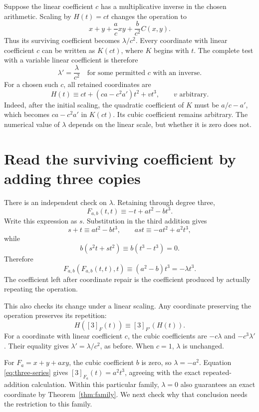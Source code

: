 Suppose the linear coefficient \(c\) has a multiplicative inverse in the chosen arithmetic. Scaling by \(H(t)=ct\) changes the operation to
\[
 x+y+\frac acxy+\frac b{c^2}C(x,y).
\]
Thus its surviving coefficient becomes \(\lambda/c^2\). Every coordinate with linear coefficient \(c\) can be written as \(K(ct)\), where \(K\) begins with \(t\). The complete test with a variable linear coefficient is therefore
\begin{equation}\label{eq:nonstrict}
 \lambda'=\frac{\lambda}{c^2}
 \quad\text{for some permitted }c\text{ with an inverse}.
\end{equation}
For a chosen such \(c\), all retained coordinates are
\[
 H(t)\equiv ct+(ca-c^2a')t^2+vt^3,
 \qquad v\text{ arbitrary}.
\]
Indeed, after the initial scaling, the quadratic coefficient of \(K\) must be \(a/c-a'\), which becomes \(ca-c^2a'\) in \(K(ct)\). Its cubic coefficient remains arbitrary. The numerical value of \(\lambda\) depends on the linear scale, but whether it is zero does not.

\section{Read the surviving coefficient by adding three copies}\label{sec:three-series}

There is an independent check on \(\lambda\). Retaining through degree three,
\[
 F_{a,b}(t,t)\equiv-t+at^2-bt^3.
\]
Write this expression as \(s\). Substitution in the third addition gives
\[
 s+t\equiv at^2-bt^3,\qquad
 a st\equiv-at^2+a^2t^3,
\]
while
\[
 b(s^2t+st^2)\equiv b(t^3-t^3)=0.
\]
Therefore
\begin{equation}\label{eq:three-series}
 \boxed{\;F_{a,b}(F_{a,b}(t,t),t)
 \equiv(a^2-b)t^3=-\lambda t^3.\;}
\end{equation}
The coefficient left after coordinate repair is the coefficient produced by actually repeating the operation.

This also checks its change under a linear scaling. Any coordinate preserving the operation preserves its repetition:
\[
 H([3]_F(t))\equiv[3]_{F'}(H(t)).
\]
For a coordinate with linear coefficient \(c\), the cubic coefficients are \(-c\lambda\) and \(-c^3\lambda'\). Their equality gives \(\lambda'=\lambda/c^2\), as before. When \(c=1\), \(\lambda\) is unchanged.

For \(F_a=x+y+a xy\), the cubic coefficient \(b\) is zero, so \(\lambda=-a^2\). Equation \eqref{eq:three-series} gives \([3]_{F_a}(t)=a^2t^3\), agreeing with the exact repeated-addition calculation. Within this particular family, \(\lambda=0\) also guarantees an exact coordinate by Theorem~\ref{thm:family}. We next check why that conclusion needs the restriction to this family.

